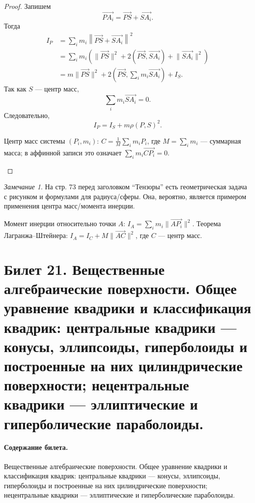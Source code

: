 \documentclass[12pt,a4paper]{article}
\theoremstyle{definition}
\theoremstyle{plain}
\theoremstyle{remark}
\newtheorem{remark}[definition]{Замечание}
\newenvironment{knowledgefix}{\begin{clarifybox}}{\end{clarifybox}}
\begin{document}
\begin{proof}
Запишем
\[
    \overrightarrow{PA_i}=\overrightarrow{PS}+\overrightarrow{SA_i}.
\]
Тогда
\[
\begin{aligned}
    I_P
    &=\sum_i m_i\left\lVert\overrightarrow{PS}+\overrightarrow{SA_i}\right\rVert^2\\
    &=\sum_i m_i\left(
        \lVert\overrightarrow{PS}\rVert^2
        +2(\overrightarrow{PS},\overrightarrow{SA_i})
        +\lVert\overrightarrow{SA_i}\rVert^2
    \right)\\
    &=m\lVert\overrightarrow{PS}\rVert^2
      +2\left(\overrightarrow{PS},\sum_i m_i\overrightarrow{SA_i}\right)
      +I_S.
\end{aligned}
\]
Так как $S$ --- центр масс,
\[
    \sum_i m_i\overrightarrow{SA_i}=0.
\]
Следовательно,
\[
    I_P=I_S+m\rho(P,S)^2.
\]
\begin{knowledgefix}
Центр масс системы \((P_i,m_i)\): \(C=\frac1M\sum_i m_i P_i\), где \(M=\sum_i m_i\) — суммарная масса; в аффинной записи это означает \(\sum_i m_i\overrightarrow{CP_i}=0\).
\end{knowledgefix}
\end{proof}

\begin{remark}
На стр. 73 перед заголовком ``Тензоры'' есть геометрическая задача с рисунком и формулами для радиуса/сферы. Она, вероятно, является примером применения центра масс/момента инерции.
\begin{knowledgefix}
Момент инерции относительно точки \(A\): \(I_A=\sum_i m_i\|\overrightarrow{AP_i}\|^2\). Теорема Лагранжа--Штейнера: \(I_A=I_C+M\|\overrightarrow{AC}\|^2\), где \(C\) — центр масс.
\end{knowledgefix}
\end{remark}

\clearpage

\section{Билет 21. Вещественные алгебраические поверхности. Общее уравнение квадрики и классификация квадрик: центральные квадрики — конусы, эллипсоиды, гиперболоиды и построенные на них цилиндрические поверхности; нецентральные квадрики — эллиптические и гиперболические параболоиды.}

\paragraph{Содержание билета.} Вещественные алгебраические поверхности. Общее уравнение квадрики и классификация квадрик: центральные квадрики — конусы, эллипсоиды, гиперболоиды и построенные на них цилиндрические поверхности; нецентральные квадрики — эллиптические и гиперболические параболоиды.
\end{document}
